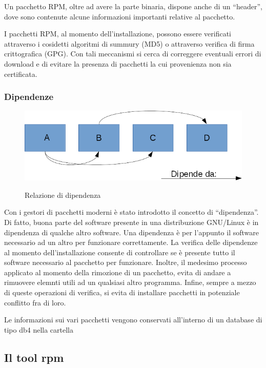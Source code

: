 Un pacchetto RPM, oltre ad avere la parte binaria, dispone anche di un ``header'', dove sono contenute alcune informazioni importanti relative al pacchetto. 

I pacchetti RPM, al momento dell'installazione, possono essere verificati attraverso i cosidetti algoritmi di summury (MD5) o attraverso verifica di firma crittografica (GPG). Con tali meccanismi si cerca di correggere eventuali errori di download e di evitare la presenza di pacchetti la cui provenienza non sia certificata. 

\subsubsection{Dipendenze}


\begin{figure}[!ht]
 \centering
 \includegraphics[scale=0.55]{Immagini/dipendenza01.png}
 \label{fig:Dipendenza}
 \caption{Relazione di dipendenza}
\end{figure}

Con i gestori di pacchetti moderni è stato introdotto il concetto di ``dipendenza''. Di fatto, buona parte del software presente in una distribuzione GNU/Linux è in dipendenza di qualche altro software. Una dipendenza è per l'appunto il software necessario ad un altro per funzionare correttamente. 
La verifica delle dipendenze al momento dell'installazione consente di controllare se è presente tutto il software necessario al pacchetto per funzionare. Inoltre, il medesimo processo applicato al momento della rimozione di un pacchetto, evita di andare a rimuovere elemnti utili ad un qualsiasi altro programma. Infine, sempre a mezzo di queste operazioni di verifica, si evita di installare pacchetti in potenziale conflitto fra di loro. 

Le informazioni sui vari pacchetti vengono conservati all'interno di un database di tipo db4 nella cartella 

\subsection{Il tool rpm}

